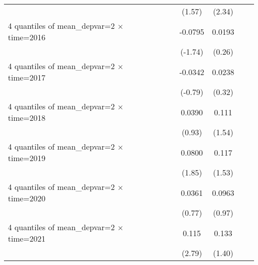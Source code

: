\begin{table}[htbp]
\begin{tabular}{l*{6}{c}}
                    &                     &                     &      (1.57)         &      (2.34)         &                     &                     \\
[1em]
4 quantiles of mean\_depvar=2 $\times$ time=2016&                     &                     &     -0.0795\sym{*}  &      0.0193         &                     &                     \\
                    &                     &                     &     (-1.74)         &      (0.26)         &                     &                     \\
[1em]
4 quantiles of mean\_depvar=2 $\times$ time=2017&                     &                     &     -0.0342         &      0.0238         &                     &                     \\
                    &                     &                     &     (-0.79)         &      (0.32)         &                     &                     \\
[1em]
4 quantiles of mean\_depvar=2 $\times$ time=2018&                     &                     &      0.0390         &       0.111         &                     &                     \\
                    &                     &                     &      (0.93)         &      (1.54)         &                     &                     \\
[1em]
4 quantiles of mean\_depvar=2 $\times$ time=2019&                     &                     &      0.0800\sym{*}  &       0.117         &                     &                     \\
                    &                     &                     &      (1.85)         &      (1.53)         &                     &                     \\
[1em]
4 quantiles of mean\_depvar=2 $\times$ time=2020&                     &                     &      0.0361         &      0.0963         &                     &                     \\
                    &                     &                     &      (0.77)         &      (0.97)         &                     &                     \\
[1em]
4 quantiles of mean\_depvar=2 $\times$ time=2021&                     &                     &       0.115\sym{**} &       0.133         &                     &                     \\
                    &                     &                     &      (2.79)         &      (1.40)         &                     &                     \\

\end{tabular}
\end{table}
